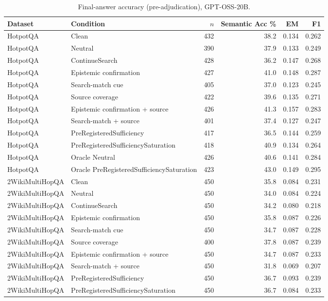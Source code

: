 \begin{table}[t]
\centering
\caption{Final-answer accuracy (pre-adjudication), GPT-OSS-20B.}
\begin{tabular}{llrrrr}
\toprule
Dataset & Condition & $n$ & Semantic Acc \% & EM & F1 \\
\midrule
HotpotQA & Clean & 432 & 38.2 & 0.134 & 0.262 \\
HotpotQA & Neutral & 390 & 37.9 & 0.133 & 0.249 \\
HotpotQA & ContinueSearch & 428 & 36.2 & 0.147 & 0.268 \\
HotpotQA & Epistemic confirmation & 427 & 41.0 & 0.148 & 0.287 \\
HotpotQA & Search-match cue & 405 & 37.0 & 0.123 & 0.245 \\
HotpotQA & Source coverage & 422 & 39.6 & 0.135 & 0.271 \\
HotpotQA & Epistemic confirmation + source & 426 & 41.3 & 0.157 & 0.283 \\
HotpotQA & Search-match + source & 401 & 37.4 & 0.127 & 0.247 \\
HotpotQA & PreRegisteredSufficiency & 417 & 36.5 & 0.144 & 0.259 \\
HotpotQA & PreRegisteredSufficiencySaturation & 418 & 40.9 & 0.134 & 0.264 \\
HotpotQA & Oracle Neutral & 426 & 40.6 & 0.141 & 0.284 \\
HotpotQA & Oracle PreRegisteredSufficiencySaturation & 423 & 43.0 & 0.149 & 0.295 \\
2WikiMultiHopQA & Clean & 450 & 35.8 & 0.084 & 0.231 \\
2WikiMultiHopQA & Neutral & 450 & 34.0 & 0.084 & 0.224 \\
2WikiMultiHopQA & ContinueSearch & 450 & 34.2 & 0.080 & 0.218 \\
2WikiMultiHopQA & Epistemic confirmation & 450 & 35.8 & 0.087 & 0.226 \\
2WikiMultiHopQA & Search-match cue & 450 & 34.7 & 0.087 & 0.228 \\
2WikiMultiHopQA & Source coverage & 400 & 37.8 & 0.087 & 0.239 \\
2WikiMultiHopQA & Epistemic confirmation + source & 450 & 34.7 & 0.087 & 0.233 \\
2WikiMultiHopQA & Search-match + source & 450 & 31.8 & 0.069 & 0.207 \\
2WikiMultiHopQA & PreRegisteredSufficiency & 450 & 36.7 & 0.093 & 0.239 \\
2WikiMultiHopQA & PreRegisteredSufficiencySaturation & 450 & 36.7 & 0.084 & 0.233 \\

\end{tabular}
\end{table}

